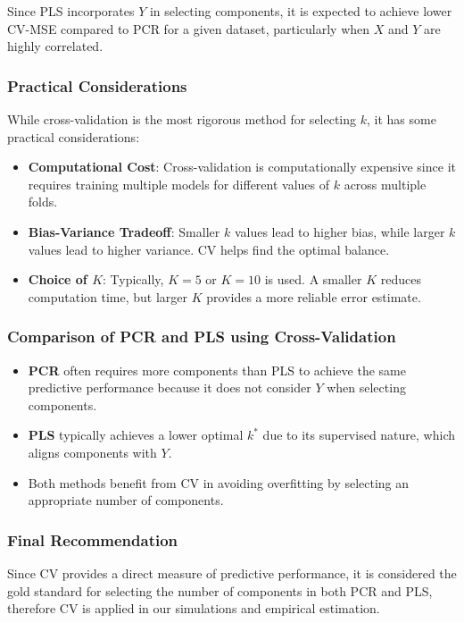 \documentclass[11pt,twoside,a4paper]{article}
\begin{document}
Since PLS incorporates \( Y \) in selecting components, it is expected to achieve lower CV-MSE compared to PCR for a given dataset, particularly when \( X \) and \( Y \) are highly correlated.

\subsubsection{Practical Considerations}
While cross-validation is the most rigorous method for selecting \( k \), it has some practical considerations:
\begin{itemize}
    \item \textbf{Computational Cost}: Cross-validation is computationally expensive since it requires training multiple models for different values of \( k \) across multiple folds.
    \item \textbf{Bias-Variance Tradeoff}: Smaller \( k \) values lead to higher bias, while larger \( k \) values lead to higher variance. CV helps find the optimal balance.
    \item \textbf{Choice of \( K \)}: Typically, \( K = 5 \) or \( K = 10 \) is used. A smaller \( K \) reduces computation time, but larger \( K \) provides a more reliable error estimate.
\end{itemize}

\subsubsection{Comparison of PCR and PLS using Cross-Validation}
\begin{itemize}
    \item \textbf{PCR} often requires more components than PLS to achieve the same predictive performance because it does not consider \( Y \) when selecting components.
    \item \textbf{PLS} typically achieves a lower optimal \( k^* \) due to its supervised nature, which aligns components with \( Y \).
    \item Both methods benefit from CV in avoiding overfitting by selecting an appropriate number of components.
\end{itemize}

\subsubsection{Final Recommendation}
Since CV provides a direct measure of predictive performance, it is considered the gold standard for selecting the number of components in both PCR and PLS, therefore CV is applied in our simulations and empirical estimation.
\end{document}
